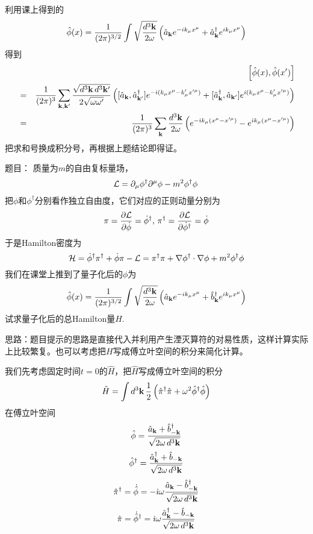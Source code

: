 \documentclass[CJK]{beamer}
\begin{document}
\begin{frame}
\bch
利用课上得到的
$${\hat{\phi}}(x) = \frac{1}{(2\pi)^{3/2}} \int \sqrt{\frac{d^3{\mathbf{k}}}{2\omega}} \left({\hat{a}}_{{\mathbf{k}}} e^{-ik_\mu x^\mu} + {\hat{a}^\dagger}_{{\mathbf{k}}}e^{ik_\mu x^\mu}\right) $$
得到
{\scriptsize
\begin{eqnarray}
&& \left[{\hat{\phi}}(x),{\hat{\phi}}(x')\right] \nonumber \\
&=& \frac{1}{(2\pi)^3}\sum_{{\mathbf{k}},{\mathbf{k}}'} \frac{\sqrt{d^3{\mathbf{k}}\, d^3{\mathbf{k}}'}}{2\sqrt{\omega \omega'}}\left([{\hat{a}}_{\mathbf{k}}, {\hat{a}^\dagger}_{{\mathbf{k}}'}]e^{-{\dot{\imath}} (k_\mu x^\mu-k'_\mu x'^\mu)} + [{\hat{a}^\dagger}_{\mathbf{k}}, {\hat{a}}_{{\mathbf{k}}'}]e^{{\dot{\imath}} (k_\mu x^\mu-k'_\mu x'^\mu) }\right) \nonumber \\
&=& \frac{1}{(2\pi)^3} \sum_{{\mathbf{k}}} \frac{d^3{\mathbf{k}}}{2\omega}\left(e^{-{\dot{\imath}} k_\mu (x^\mu - x'^\mu)} - e^{{\dot{\imath}} k_\mu (x^\mu - x'^\mu)}\right) \nonumber
\end{eqnarray}
}
把求和号换成积分号，再根据上题结论即得证。
\ech
\end{frame}

\begin{frame}
\bch
题目：
{\scriptsize 
质量为$m$的自由复标量场，
$${\mathcal{L}} = \partial_\mu\phi^\dagger \partial^\mu \phi - m^2\phi^\dagger\phi\, $$
把$\phi$和$\phi^\dagger$分别看作独立自由度，它们对应的正则动量分别为
$$\pi = \frac{\partial {\mathcal{L}}}{\partial \dot\phi} = \dot\phi^\dagger, \,\pi^\dagger = \frac{\partial {\mathcal{L}}}{\partial \dot\phi^\dagger} = \dot\phi $$
于是Hamilton密度为
$${\mathcal{H}} = \dot\phi^\dagger \pi^\dagger +\dot\phi \pi - {\mathcal{L}} = \pi^\dagger \pi + \nabla\phi^\dagger \cdot\nabla\phi + m^2\phi^\dagger \phi $$
我们在课堂上推到了量子化后的$\phi$为
$${\hat{\phi}}(x) = \frac{1}{(2\pi)^{3/2}} \int \sqrt{\frac{d^3{\mathbf{k}}}{2\omega}} \left({\hat{a}}_{{\mathbf{k}}} e^{-ik_\mu x^\mu} + {\hat{b}^\dagger}_{{\mathbf{k}}}e^{ik_\mu x^\mu}\right) $$
试求量子化后的总Hamilton量$\hat{H}$.
}

\skipline
思路：题目提示的思路是直接代入并利用产生湮灭算符的对易性质，这样计算实际上比较繁复。也可以考虑把$H$写成傅立叶空间的积分来简化计算。
\ech
\end{frame}

\begin{frame}
\bch
我们先考虑固定时间$t=0$的$\hat{H}$，把$\hat{H}$写成傅立叶空间的积分
$$\hat{H} = \int d^3{\mathbf{k}}\, \frac{1}{2}\left({\hat{\pi}}^\dagger{\hat{\pi}} + \omega^2{\hat{\phi}}^\dagger{\hat{\phi}}\right)$$ 
在傅立叶空间
$${\hat{\phi}} = \frac{{\hat{a}}_{{\mathbf{k}}}+{\hat{b}^\dagger}_{-{\mathbf{k}}}}{\sqrt{2\omega\,d^3{\mathbf{k}}}}$$
$${\hat{\phi}}^\dagger =  \frac{{\hat{a}^\dagger}_{{\mathbf{k}}}+{\hat{b}}_{-{\mathbf{k}}}}{\sqrt{2\omega\,d^3{\mathbf{k}}}}$$
$${\hat{\pi}}^\dagger = \dot{{\hat{\phi}}} = -{\dot{\imath}}\omega \frac{{\hat{a}}_{{\mathbf{k}}}-{\hat{b}^\dagger}_{-{\mathbf{k}}}}{\sqrt{2\omega\,d^3{\mathbf{k}}}}$$
$${\hat{\pi}} = \dot{{\hat{\phi}}}^\dagger = {\dot{\imath}} \omega\frac{{\hat{a}^\dagger}_{{\mathbf{k}}}-{\hat{b}}_{-{\mathbf{k}}}}{\sqrt{2\omega\,d^3{\mathbf{k}}}} $$

\ech
\end{frame}
\end{document}

